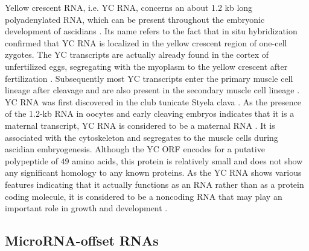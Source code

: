 \documentclass[graybox]{svmult}
\begin{document}
Yellow crescent RNA, i.e. YC RNA, concerns an about 1.2 kb long polyadenylated 
RNA, which can be present throughout the embryonic development of ascidians 
\cite{Swalla1995}. Its name refers to the fact that in situ hybridization 
confirmed that YC RNA is localized in the yellow crescent region of one-cell 
zygotes. The YC transcripts are actually already found in the cortex of 
unfertilized eggs, segregating with the myoplasm to the yellow crescent after 
fertilization \cite{Swalla1995}. Subsequently most YC transcripts enter the 
primary muscle cell lineage after cleavage and are also present in the 
secondary muscle cell lineage \cite{Swalla1995}. YC RNA was first 
discovered in the club tunicate Styela clava \cite{Swalla1995}. As the presence 
of the 1.2-kb RNA in oocytes and early cleaving embryos indicates that it is a 
maternal transcript, YC RNA is considered to be a maternal RNA 
\cite{Swalla1995}. It is associated with the cytoskeleton and segregates to 
the muscle cells during ascidian embryogenesis. Although the YC ORF encodes for 
a putative polypeptide of $49$ amino acids, this protein is relatively small 
and does not show any significant homology to any known proteins. As the YC RNA 
shows various features indicating that it actually functions as an RNA rather 
than as a protein coding molecule, it is considered to be a noncoding RNA that 
may play an important role in growth and development \cite{Swalla1995}.

\subsection{MicroRNA-offset RNAs}
\end{document}
